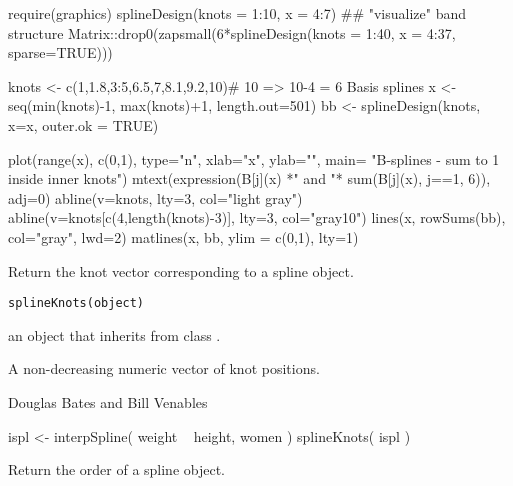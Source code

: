 \begin{Examples}
\begin{ExampleCode}
require(graphics)
splineDesign(knots = 1:10, x = 4:7)
## "visualize" band structure
Matrix::drop0(zapsmall(6*splineDesign(knots = 1:40, x = 4:37, sparse=TRUE)))

knots <- c(1,1.8,3:5,6.5,7,8.1,9.2,10)# 10 => 10-4 = 6 Basis splines
x <- seq(min(knots)-1, max(knots)+1, length.out=501)
bb <- splineDesign(knots, x=x, outer.ok = TRUE)

plot(range(x), c(0,1), type="n", xlab="x", ylab="",
     main= "B-splines - sum to 1 inside inner knots")
mtext(expression(B[j](x) *"  and "* sum(B[j](x), j==1, 6)), adj=0)
abline(v=knots, lty=3, col="light gray")
abline(v=knots[c(4,length(knots)-3)], lty=3, col="gray10")
lines(x, rowSums(bb), col="gray", lwd=2)
matlines(x, bb, ylim = c(0,1), lty=1)
\end{ExampleCode}
\end{Examples}
%
\begin{Description}\relax
Return the knot vector corresponding to a spline object.
\end{Description}
%
\begin{Usage}
\begin{verbatim}
splineKnots(object)
\end{verbatim}
\end{Usage}
%
\begin{Arguments}
\begin{ldescription}
\item[\code{object}] an object that inherits from class .
\end{ldescription}
\end{Arguments}
%
\begin{Value}
A non-decreasing numeric vector of knot positions.
\end{Value}
%
\begin{Author}\relax
Douglas Bates and Bill Venables
\end{Author}
%
\begin{Examples}
\begin{ExampleCode}
ispl <- interpSpline( weight ~ height, women )
splineKnots( ispl )
\end{ExampleCode}
\end{Examples}
%
\begin{Description}\relax
Return the order of a spline object.
\end{Description}
